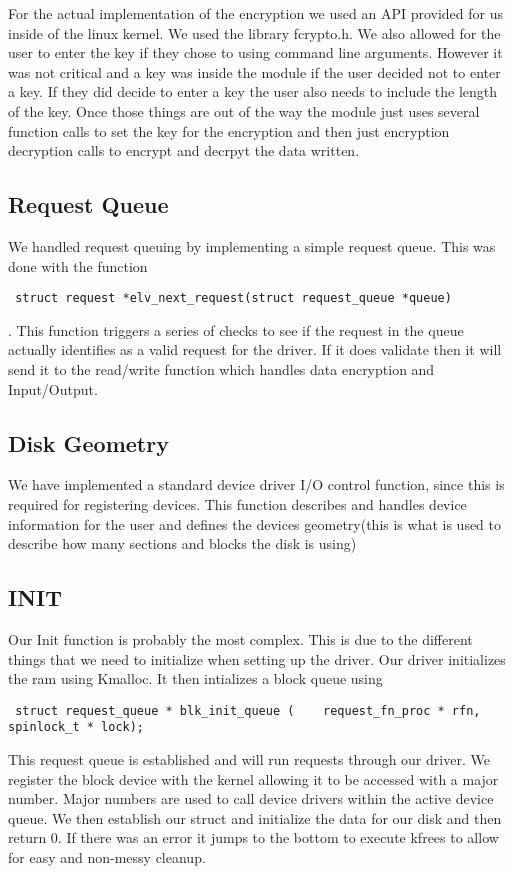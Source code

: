 \documentclass[onecolumn, draftclsnofoot,10pt, compsoc]{IEEEtran}
\begin{document}
        For the actual implementation of the encryption we used an API provided for us inside of the linux kernel. We used the library fcrypto.h. We also allowed for the user to enter the key if they chose to using command line arguments. However it was not critical and a key was inside the module if the user decided not to enter a key. If they did decide to enter a key the user also needs to include the length of the key. Once those things are out of the way the module just uses several function calls to set the key for the encryption and then just encryption decryption calls to encrypt and decrpyt the data written.
    
    \subsection{Request Queue}
    We handled request queuing by implementing a simple request queue. This was done with the function \begin{verbatim} struct request *elv_next_request(struct request_queue *queue) \end{verbatim}. This function triggers a series of checks to see if the request in the queue actually identifies as a valid request for the driver. If it does validate then it will send it to the read/write function which handles data encryption and Input/Output.
    
    \subsection{ Disk Geometry}
    We have implemented a standard device driver I/O control function, since this is required for registering devices. This function describes and handles device information for the user and defines the devices geometry(this is what is used to describe how many sections and blocks the disk is using)
    
    \subsection{INIT}
    Our Init function is probably the most complex. This is due to the different things that we need to initialize when setting up the driver. Our driver initializes the ram using Kmalloc. It then intializes a block queue using \begin{verbatim} struct request_queue * blk_init_queue (    request_fn_proc * rfn, spinlock_t * lock); \end{verbatim} This request queue is established and will run requests through our driver. We register the block device with the kernel allowing it to be accessed with a major number. Major numbers are used to call device drivers within the active device queue. We then establish our struct and initialize the data for our disk and then return 0. If there was an error it jumps to the bottom to execute kfrees to allow for easy and non-messy cleanup.
    
\end{document}

